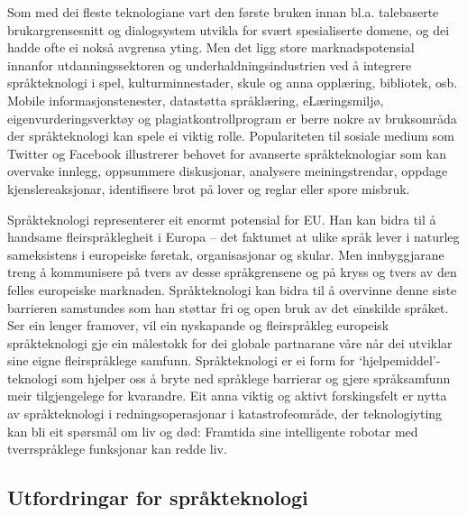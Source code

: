 \begin{multicols}{2}
Som med dei fleste teknologiane vart den første bruken innan bl.a. talebaserte brukargrensesnitt og dialogsystem utvikla for svært spesialiserte domene, og dei hadde ofte ei nokså avgrensa yting. Men det ligg store marknadspotensial innanfor utdanningssektoren og underhaldningsindustrien ved å integrere språkteknologi i spel, kulturminnestader, skule og anna opplæring, bibliotek, osb. Mobile informasjonstenester, datastøtta språklæring, eLæringsmiljø, eigenvurderingsverktøy og plagiatkontrollprogram er berre nokre av bruksområda der språkteknologi kan spele ei viktig rolle. Populariteten til sosiale medium som Twitter og Facebook illustrerer behovet for avanserte språkteknologiar som kan overvake innlegg, oppsummere diskusjonar, analysere meiningstrendar, oppdage kjenslereaksjonar, identifisere brot på lover og reglar eller spore misbruk.


Språkteknologi representerer eit enormt potensial for EU. Han kan
bidra til å handsame fleirspråklegheit i Europa – det faktumet at
ulike språk lever i naturleg sameksistens i europeiske føretak,
organisasjonar og skular. Men innbyggjarane treng å kommunisere på
tvers av desse språkgrensene og på kryss og tvers av den felles
europeiske marknaden. Språkteknologi kan bidra til å overvinne denne
siste barrieren samstundes som han støttar fri og open bruk av det
einskilde språket. Ser ein lenger framover, vil ein nyskapande og
fleirspråkleg europeisk språkteknologi gje ein målestokk for dei
globale partnarane våre når dei utviklar sine eigne fleirspråklege
samfunn. Språkteknologi er ei form for `hjelpemiddel'-teknologi som hjelper oss å bryte ned språklege barrierar og gjere språksamfunn meir tilgjengelege for kvarandre. 
Eit anna viktig og aktivt forskingsfelt er nytta av språkteknologi i redningsoperasjonar i katastrofeområde, der teknologiyting kan bli eit spørsmål om liv og død: Framtida sine intelligente robotar med tverrspråklege funksjonar kan redde liv. 
 
\subsection{Utfordringar for språkteknologi}


\end{multicols}
